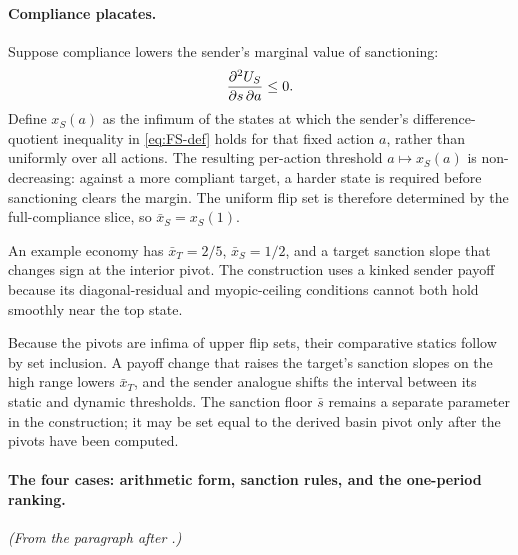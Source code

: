 \paragraph{Compliance placates.}
Suppose compliance lowers the sender's marginal value of sanctioning:
\[
\frac{\partial^2U_S}{\partial s\,\partial a}\le0.
\]
Define
$x_S(a)$ as the infimum of the states at which the sender's difference-quotient inequality in
\eqref{eq:FS-def} holds for that fixed action $a$, rather than uniformly
over all actions. The resulting per-action threshold
$a\mapsto x_S(a)$ is non-decreasing: against a more compliant target,
a harder state is required before sanctioning clears the margin. The
uniform flip set is therefore determined by the full-compliance slice,
so $\bar x_S=x_S(1)$.

An example economy has
$\bar x_T=2/5$, $\bar x_S=1/2$, and a target sanction slope that changes
sign at the interior pivot. The construction uses a kinked sender payoff
because its diagonal-residual and myopic-ceiling conditions cannot both
hold smoothly near the top state.

Because the pivots are infima of upper flip sets, their comparative
statics follow by set inclusion. A payoff change that raises the
target's sanction slopes on the high range lowers $\bar x_T$, and the sender
analogue shifts the interval between its static and dynamic thresholds.
The sanction floor $\bar s$ remains
a separate parameter in the construction; it may be set equal to the
derived basin pivot only after the pivots have been computed.

\paragraph{The four cases: arithmetic form, sanction rules, and the one-period ranking.} \emph{(From the paragraph after .)}

